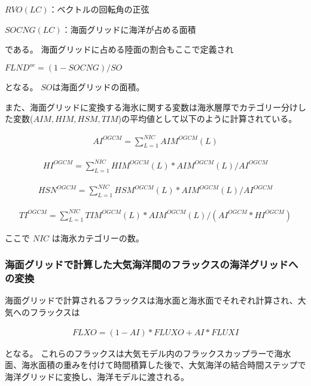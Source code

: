 \(RVO(LC)\)：ベクトルの回転角の正弦

\(SOCNG(LC)\)：海面グリッドに海洋が占める面積

である。 海面グリッドに占める陸面の割合もここで定義され

\(FLND^{oc}=(1-SOCNG)/SO\)

となる。 \(SO\)は海面グリッドの面積。

また、海面グリッドに変換する海氷に関する変数は海氷層厚でカテゴリー分けした変数(\(AIM,HIM,HSM,TIM\))の平均値として以下のように計算されている。

\begin{eqnarray} AI^{OGCM} = \sum_{L=1}^{NIC} AIM^{OGCM}(L) \end{eqnarray}

\begin{eqnarray} HI^{OGCM} = \sum_{L=1}^{NIC} HIM^{OGCM}(L)*AIM^{OGCM}(L)/AI^{OGCM} \end{eqnarray}

\begin{eqnarray} HSN^{OGCM} = \sum_{L=1}^{NIC} HSM^{OGCM}(L)*AIM^{OGCM}(L)/AI^{OGCM} \end{eqnarray}

\begin{eqnarray} TI^{OGCM} = \sum_{L=1}^{NIC} TIM^{OGCM}(L)*AIM^{OGCM}(L)/(AI^{OGCM}*HI^{OGCM}) \end{eqnarray}

ここで \(NIC\) は海氷カテゴリーの数。

\hypertarget{ux6d77ux9762ux30b0ux30eaux30c3ux30c9ux3067ux8a08ux7b97ux3057ux305fux5927ux6c17ux6d77ux6d0bux9593ux306eux30d5ux30e9ux30c3ux30afux30b9ux306eux6d77ux6d0bux30b0ux30eaux30c3ux30c9ux3078ux306eux5909ux63db}{%
\subsubsection{海面グリッドで計算した大気海洋間のフラックスの海洋グリッドへの変換}\label{ux6d77ux9762ux30b0ux30eaux30c3ux30c9ux3067ux8a08ux7b97ux3057ux305fux5927ux6c17ux6d77ux6d0bux9593ux306eux30d5ux30e9ux30c3ux30afux30b9ux306eux6d77ux6d0bux30b0ux30eaux30c3ux30c9ux3078ux306eux5909ux63db}}

海面グリッドで計算されるフラックスは海水面と海氷面でそれぞれ計算され、大気へのフラックスは

\begin{eqnarray} FLXO=(1-AI)*FLUXO+AI*FLUXI \end{eqnarray}

となる。
これらのフラックスは大気モデル内のフラックスカップラーで海水面、海氷面積の重みを付けて時間積算した後で、大気海洋の結合時間ステップで海洋グリッドに変換し、海洋モデルに渡される。

